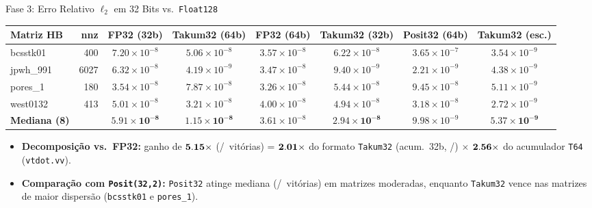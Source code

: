 \documentclass[aspectratio=169,10pt]{beamer}
\begin{document}
\begin{frame}{Fase 3: Erro Relativo $\ell_2$ em 32 Bits vs.\ \texttt{Float128}}
	\footnotesize
	\begin{table}
		\centering
		\setlength{\tabcolsep}{2.4pt}
		\renewcommand{\arraystretch}{1.10}
		\begin{tabular}{@{}lrcccccc@{}}
			\toprule
			\textbf{Matriz HB} & \textbf{nnz} & \textbf{FP32 (32b)} & \textbf{Takum32 (64b)} & \textbf{FP32 (64b)} & \textbf{Takum32 (32b)} & \textbf{Posit32 (64b)} & \textbf{Takum32 (esc.)} \\
			\midrule
			bcsstk01 & 400 & $7.20 \times 10^{-8}$ & $5.06 \times 10^{-8}$ & $3.57 \times 10^{-8}$ & $6.22 \times 10^{-8}$ & $3.65 \times 10^{-7}$ & $3.54 \times 10^{-9}$ \\
			jpwh\_991 & 6027 & $6.32 \times 10^{-8}$ & $4.19 \times 10^{-9}$ & $3.47 \times 10^{-8}$ & $9.40 \times 10^{-9}$ & $2.21 \times 10^{-9}$ & $4.38 \times 10^{-9}$ \\
			pores\_1 & 180 & $3.54 \times 10^{-8}$ & $7.87 \times 10^{-8}$ & $3.26 \times 10^{-8}$ & $5.44 \times 10^{-8}$ & $9.45 \times 10^{-8}$ & $5.11 \times 10^{-9}$ \\
			west0132 & 413 & $5.01 \times 10^{-8}$ & $3.21 \times 10^{-8}$ & $4.00 \times 10^{-8}$ & $4.94 \times 10^{-8}$ & $3.18 \times 10^{-8}$ & $2.72 \times 10^{-9}$ \\
			\midrule
			\textbf{Mediana (8)} & & $\mathbf{5.91 \times 10^{-8}}$ & $\mathbf{1.15 \times 10^{-8}}$ & $3.61 \times 10^{-8}$ & $\mathbf{2.94 \times 10^{-8}}$ & $9.98 \times 10^{-9}$ & $\mathbf{5.37 \times 10^{-9}}$ \\
			\bottomrule
		\end{tabular}
	\end{table}
	\begin{itemize}
		\item \textbf{Decomposição vs.\ FP32:} ganho de $\mathbf{5.15\times}$ (\ParTrintaFPTakumVence/\ParTrintaFPAmbos\ vitórias) = $\mathbf{2.01\times}$ do formato \texttt{Takum32} (acum.\ 32b, \ParTrintaAcFPTakumVence/\ParTrintaAcFPAmbos) $\times$ $\mathbf{2.56\times}$ do acumulador \texttt{T64} (\texttt{vtdot.vv}).
		\item \textbf{Comparação com \texttt{Posit(32,2)}:} \texttt{Posit32} atinge mediana \MedPositTrinta (\ParTrintaPositOutroVence/\ParTrintaPositAmbos\ vitórias) em matrizes moderadas, enquanto \texttt{Takum32} vence nas matrizes de maior dispersão (\texttt{bcsstk01} e \texttt{pores\_1}).
	\end{itemize}
\end{frame}
\end{document}
